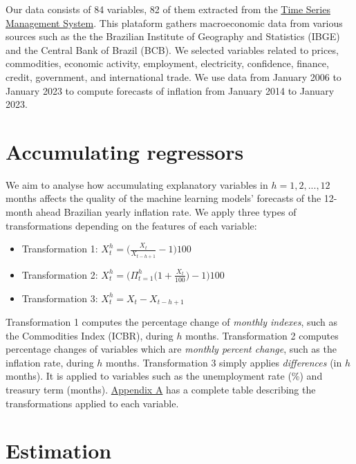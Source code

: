 \documentclass[12pt,openright,twoside,a4paper,brazil,english,emptypage,openany]{abntex2}
\begin{document}
\hspace{1em} Our data consists of 84 variables, 82 of them extracted from the \href{https://www3.bcb.gov.br/sgspub/localizarseries/localizarSeries.do?method=prepararTelaLocalizarSeries}{Time Series Management System}. This plataform gathers macroeconomic data from various sources such as the the Brazilian Institute of Geography and Statistics (IBGE) and the Central Bank of Brazil (BCB). We selected variables related to prices, commodities, economic activity, employment, electricity, confidence, finance, credit, government, and international trade. We use data from January 2006 to January 2023 to compute forecasts of inflation from January 2014 to January 2023.

\section{Accumulating regressors}
\label{sec:transformations}
\hspace{1em} We aim to analyse how accumulating explanatory variables in $h = 1,2,...,12$ months affects the quality of the machine learning models' forecasts of the 12-month ahead Brazilian yearly inflation rate. We apply three types of transformations depending on the features of each variable: 


\begin{itemize}
    \item Transformation 1: $\displaystyle X^{h}_t = \Big(\frac{X_t}{X_{t-h+1}}-1\Big)100$
    \item Transformation 2: $\displaystyle X^h_t =  \Big(\Pi_{t=1}^h \Big(1+ \frac{X_t}{100} \Big)-1\Big)100$
    \item Transformation 3: $\displaystyle X^{h}_t = X_t - X_{t-h+1}$
\end{itemize}

 Transformation 1 computes the percentage change of \textit{monthly indexes}, such as the Commodities Index (ICBR), during $h$ months. Transformation 2 computes percentage changes of variables which are \textit{monthly percent change}, such as the inflation rate, during $h$ months. Transformation 3 simply applies \textit{differences} (in $h$ months). It is applied to variables such as the unemployment rate (\%) and treasury term (months). \hyperref[sec:transformation.table]{Appendix A} has a complete table describing the transformations applied to each variable. 


\section{Estimation}
\end{document}
